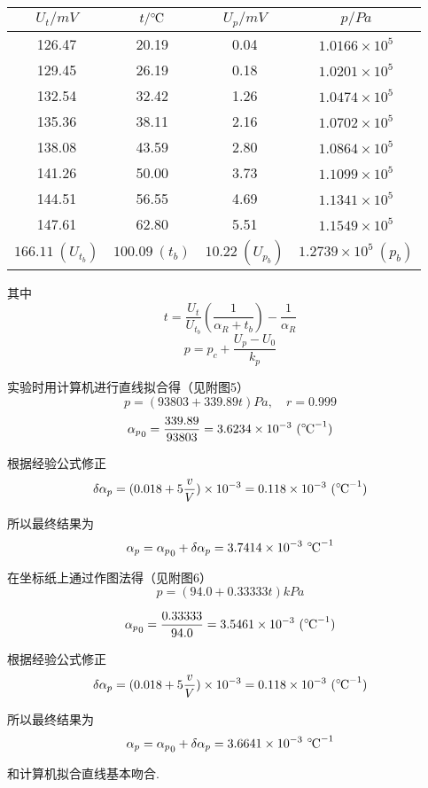 \documentclass{thureport}
\def\celsius{{\ensuremath{^\circ\hspace{-0.09em}\mathrm{C}}}}
\begin{document}
\begin{table}[H]
	\centering
	  \begin{tabular}{|c|c|c|c|}
	  \hline
	  $U_t/mV$ & $t/\celsius$     & $U_p/mV$ & $p/Pa$ \bigstrut\\
	  \hline
	  126.47  & 20.19  & 0.04  & $1.0166\times10^5$ \bigstrut\\
	  \hline
	  129.45  & 26.19  & 0.18  & $1.0201\times10^5$ \bigstrut\\
	  \hline
	  132.54  & 32.42  & 1.26  & $1.0474\times10^5$ \bigstrut\\
	  \hline
	  135.36  & 38.11  & 2.16  & $1.0702\times10^5$ \bigstrut\\
	  \hline
	  138.08  & 43.59  & 2.80  & $1.0864\times10^5$ \bigstrut\\
	  \hline
	  141.26  & 50.00  & 3.73  & $1.1099\times10^5$ \bigstrut\\
	  \hline
	  144.51  & 56.55  & 4.69  & $1.1341\times10^5$ \bigstrut\\
	  \hline
	  147.61  & 62.80  & 5.51  & $1.1549\times10^5$ \bigstrut\\
	  \hline
	  $166.11\ (U_{t_b})$  & $100.09\ (t_b)$  & $10.22\ (U_{p_b})$  & $1.2739\times10^5\ (p_b)$ \bigstrut\\
	  \hline
	  \end{tabular}%
\end{table}%

其中
$$t=\frac{U_t}{U_{t_b}}(\frac{1}{\alpha_R+t_b})-\frac{1}{\alpha_R}$$
$$p=p_c+\frac{U_p-U_0}{k_p}$$

实验时用计算机进行直线拟合得（见附图5）
$$p=(93803+339.89t)Pa,\quad r=0.999$$
$${\alpha_p}_0=\frac{339.89}{93803}=3.6234\times10^{-3}\ (\celsius^{-1})$$

根据经验公式修正
$$\delta \alpha_p=(0.018+5\frac{v}{V})\times10^{-3}=0.118\times10^{-3}\ (\celsius^{-1})$$

所以最终结果为
$$\alpha_p={\alpha_p}_0+\delta \alpha_p=3.7414\times10^{-3}\ \celsius^{-1}$$

在坐标纸上通过作图法得（见附图6）
$$p=(94.0+0.33333t)kPa$$

$${\alpha_p}_0=\frac{0.33333}{94.0}=3.5461\times10^{-3}\ (\celsius^{-1})$$

根据经验公式修正
$$\delta \alpha_p=(0.018+5\frac{v}{V})\times10^{-3}=0.118\times10^{-3}\ (\celsius^{-1})$$

所以最终结果为
$$\alpha_p={\alpha_p}_0+\delta \alpha_p=3.6641\times10^{-3}\ \celsius^{-1}$$

和计算机拟合直线基本吻合.
\end{document}

